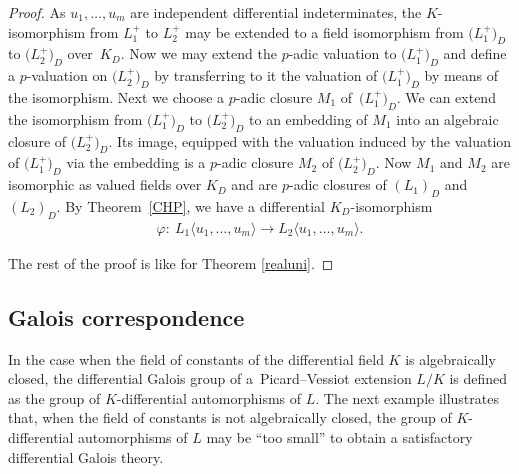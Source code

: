 \documentclass[pdftex]{sigma}%
\numberwithin{equation}{section}
\begin{document}
\begin{proof} As $u_1,\dots,u_m$ are independent differential indeterminates, the $K$-isomorphism from $L_1^+$ to $L_2^+$ may be extended to a field isomorphism from $\big(L_1^+\big)_D$ to $\big(L_2^+\big)_D$ over~$K_D$. Now we may extend the $p$-adic valuation to $\big(L_1^+\big)_D$ and define a $p$-valuation on $\big(L_2^+\big)_D$ by transferring to it the valuation of $\big(L_1^+\big)_D$ by means of the isomorphism.
Next we choose a $p$-adic closure $M_1$ of~$\big(L_1^+\big)_D$. We can extend the isomorphism from $\big(L_1^+\big)_D$ to $\big(L_2^+\big)_D$ to an embedding of $M_1$ into an algebraic closure of $\big(L_2^+\big)_D$. Its image, equipped with the valuation induced by the valuation of $\big(L_1^+\big)_D$ via the embedding is a $p$-adic closure $M_2$ of $\big(L_2^+\big)_D$. Now $M_1$ and $M_2$ are isomorphic as valued fields over $K_D$ and are $p$-adic closures of $(L_1)_D$ and $(L_2)_D$. By Theorem~\ref{CHP}, we have a differential $K_D$-isomorphism
\begin{gather*}
\varphi\colon\ L_1\langle u_1,\dots,u_m \rangle \rightarrow L_2\langle u_1,\dots,u_m \rangle.
\end{gather*}

The rest of the proof is like for Theorem \ref{realuni}.
\end{proof}

\subsection{Galois correspondence}

In the case when the field of constants of the differential field $K$ is algebraically closed, the dif\-fe\-ren\-tial Galois group of a~Picard--Vessiot extension $L/K$ is defined as the group of $K$-differential automorphisms of $L$. The next example illustrates that, when the field of constants is not algebraically closed, the group of $K$-differential automorphisms of $L$ may be ``too small'' to obtain a satisfactory differential Galois theory.
\end{document}
